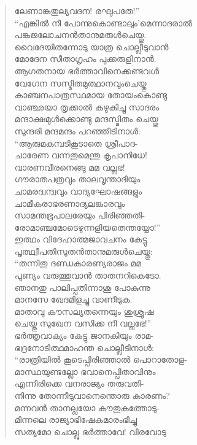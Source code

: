 \begin{verse}
ലേണാങ്കതുല്യവദന! രഘുപതേ!”\\
“എങ്കില്‍ നീ പോന്നുകൊണ്ടാലും’മെന്നാദരാല്‍\\
പങ്കജലോചനന്‍താനുമരുള്‍ചെയ്തു.\\
വൈദേയിതന്നോടു യാത്ര ചൊല്ലീടുവാന്‍\\
മോദേന സീതാഗൃഹം പുക്കരുളിനാന്‍.\\
ആഗതനായ ഭര്‍ത്താവിനെക്കണ്ടവള്‍\\
വേഗേന സസ്മിതമുത്ഥാനവുംചെയ്തു\\
കാഞ്ചനപാത്രസ്ഥമായ തോയംകൊണ്ടു\\
വാഞ്ഛയാ തൃക്കാല്‍ കഴുകിച്ചു സാദരം\\
മന്ദാക്ഷമുള്‍ക്കൊണ്ടു മന്ദസ്മിതം ചെയ്തു\\
സുന്ദരി മന്ദമന്ദം പറഞ്ഞീടിനാള്‍:\\
“ആരുമകമ്പടികൂടാതെ ശ്രീപാദ-\\
ചാരേണ വന്നതുമെന്തു കൃപാനിധേ!\\
വാരണവീരനെങ്ങു മമ വല്ലഭ!\\
ഗൗരാതപത്രവും താലവൃന്താദിയും\\
ചാമരദ്വന്ദ്വവും വാദ്യഘോഷങ്ങളും\\
ചാമീകരാഭരണാദ്യലങ്കാരവും\\
സാമന്തഭൂപാലരേയും പിരിഞ്ഞതി-\\
രോമാഞ്ചമോടെഴുന്നളിയതെന്തയ്യോ!”\\
ഇത്ഥം വിദേഹാത്മജാവചനം കേട്ടു\\
പൃത്ഥ്വീപതിസുതന്‍താനുമരുള്‍ചെയ്തു:\\
“തന്നിതു ദണ്ഡകാരണ്യരാജം മമ\\
പുണ്യം വരുത്തുവാന്‍ താതനറികെടോ.\\
ഞാനതു പാലിപ്പതിന്നാശു പോകുന്നു\\
മാനസേ ഖേദമിളച്ചു വാണീടുക.\\
മാതാവു കൗസല്യതന്നെയും ശുശ്രൂഷ\\
ചെയ്തു സുഖേന വസിക്ക നീ വല്ലഭേ!”\\
ഭര്‍ത്തൃവാക്യം കേട്ടു ജാനകിയും രാമ-\\
ഭദ്രനോടിത്ഥമാഹന്ത ചൊല്ലീടിനാള്‍:\\
“രാത്രിയില്‍ കൂടെപ്പിരിഞ്ഞാല്‍ പൊറാതോള-\\
മാസ്ഥയുണ്ടല്ലോ ഭവാനെപ്പിതാവിനും\\
എന്നിരിക്കെ വനരാജ്യം തരുവതി-\\
നിന്നു തോന്നീടുവാനെന്തൊരു കാരണം?\\
മന്നവന്‍ താനല്ലയോ കൗതുകത്തോടു-\\
മിന്നലെ രാജ്യാഭിഷേകമാരംഭിച്ചു\\
സത്യമോ ചൊല്ലു ഭര്‍ത്താവേ! വിരവോടു\\

\end{verse}
